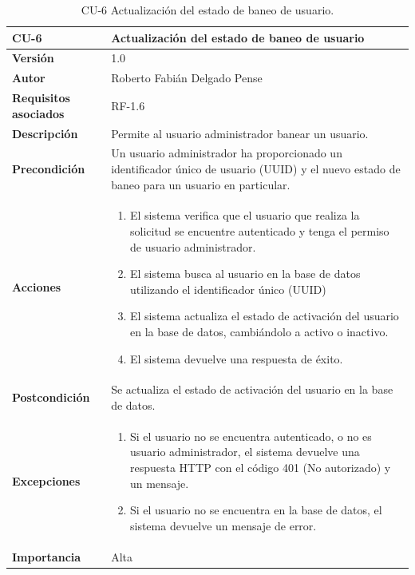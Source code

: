 \begin{table}[p]
	\centering
	\begin{tabularx}{\linewidth}{ p{} p{} }
		\toprule
		\textbf{CU-6}    & \textbf{Actualización del estado de baneo de usuario}\\
		\toprule
		\textbf{Versión}              & 1.0    \\
		\textbf{Autor}                & Roberto Fabián Delgado Pense \\
		\textbf{Requisitos asociados} & RF-1.6 \\ 
		\textbf{Descripción}          & Permite al usuario administrador banear un usuario. \\
		\textbf{Precondición}         & Un usuario administrador ha proporcionado un identificador único de usuario (UUID) y el                                          nuevo estado de baneo para un usuario en particular.\\
		\textbf{Acciones}             &
		\begin{enumerate}
			\def\labelenumi{\arabic{enumi}.}
			\tightlist
                \item El sistema verifica que el usuario que realiza la solicitud se encuentre autenticado y tenga el  permiso de usuario administrador.
			\item El sistema busca al usuario en la base de datos utilizando el identificador único (UUID)
			\item El sistema actualiza el estado de activación del usuario en la base de datos, cambiándolo a activo             o inactivo.
                \item El sistema devuelve una respuesta de éxito.
            \end{enumerate}\\
		\textbf{Postcondición}        & Se actualiza el estado de activación del usuario en la base de datos.\\
		\textbf{Excepciones}          &
              \begin{enumerate}
			\def\labelenumi{\arabic{enumi}.}
			\tightlist
			\item Si el usuario no se encuentra autenticado, o no es usuario administrador, el sistema devuelve una                 respuesta HTTP con el código 401 (No autorizado) y un mensaje.
                \item   Si el usuario no se encuentra en la base de datos, el sistema devuelve un                                            mensaje de error. 
            \end{enumerate}\\
  		\textbf{Importancia}          & Alta \\
		\bottomrule
	\end{tabularx}
	\caption{CU-6 Actualización del estado de baneo de usuario.}
\end{table}

